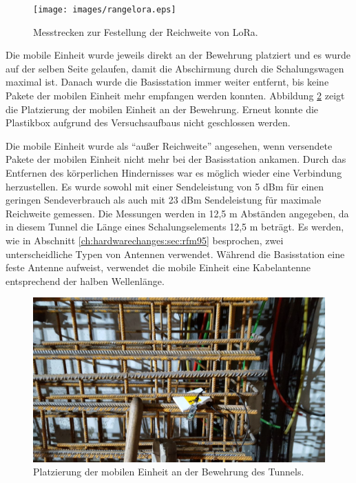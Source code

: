 \begin{figure}[h!]
  \centering
	\texttt{[image: images/rangelora.eps]}
  \caption{Messtrecken zur Festellung der Reichweite von LoRa.}
  \label{fig:rangelora}
\end{figure}

Die mobile Einheit wurde jeweils direkt an der Bewehrung platziert und es wurde auf der selben Seite gelaufen, damit die Abschirmung durch die Schalungswagen maximal ist.
Danach wurde die Basisstation immer weiter entfernt, bis keine Pakete der mobilen Einheit mehr empfangen werden konnten.
Abbildung \ref{fig:lorabasis} zeigt die Platzierung der mobilen Einheit an der Bewehrung.
Erneut konnte die Plastikbox aufgrund des Versuchsaufbaus nicht geschlossen werden.

Die mobile Einheit wurde als "`außer Reichweite"' angesehen, wenn versendete Pakete der mobilen Einheit nicht mehr bei der Basisstation ankamen.
Durch das Entfernen des körperlichen Hindernisses war es möglich wieder eine Verbindung herzustellen.
Es wurde sowohl mit einer Sendeleistung von 5 dBm für einen geringen Sendeverbrauch als auch mit 23 dBm Sendeleistung für maximale Reichweite gemessen.
Die Messungen werden in 12,5 m Abständen angegeben, da in diesem Tunnel die Länge eines Schalungselements 12,5 m beträgt.
Es werden, wie in Abschnitt \ref{ch:hardwarechanges:sec:rfm95} besprochen, zwei unterscheidliche Typen von Antennen verwendet. 
Während die Basisstation eine feste Antenne aufweist, verwendet die mobile Einheit eine Kabelantenne entsprechend der halben Wellenlänge. 

\begin{figure}[h]
  \centering
	\includegraphics[width=\textwidth]{images/lorabasis.jpg}
  \caption{Platzierung der mobilen Einheit an der Bewehrung des Tunnels.}
  \label{fig:lorabasis}
\end{figure}

